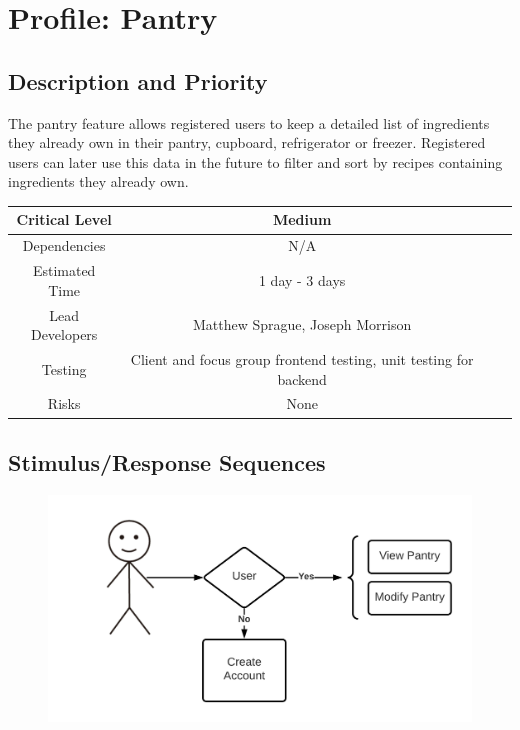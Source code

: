 \documentclass{scrreprt}
\begin{document}
\section{Profile: Pantry}

\subsection{Description and Priority}

The pantry feature allows registered users to keep a detailed list of ingredients they already own in their pantry, cupboard, refrigerator or freezer. Registered users can later use this data in the future to filter and sort by recipes containing ingredients they already own.

\begin{center}
    \begin{tabular}{| c | c | c | c |}
        \hline
        Critical Level  & Medium                                                            \\
        \hline
        Dependencies    & N/A                                                               \\
        \hline
        Estimated Time  & 1 day - 3 days                                                    \\
        \hline
        Lead Developers & Matthew Sprague, Joseph Morrison                                  \\
        \hline
        Testing         & Client and focus group frontend testing, unit testing for backend \\
        \hline
        Risks           & None                                                              \\
        \hline
    \end{tabular}
\end{center}

\subsection{Stimulus/Response Sequences}

\begin{figure}[H]\centering
    \includegraphics[width=\columnwidth]{FlowCharts/Profile-Pantry.png}
\end{figure}
\end{document}

